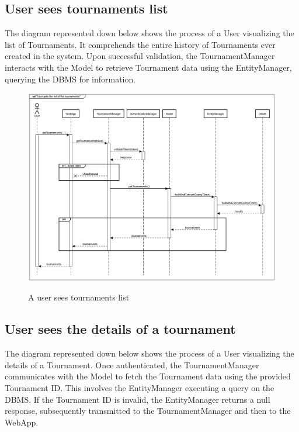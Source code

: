 \documentclass{Configuration_Files/Template}
\begin{document}
\subsection{User sees tournaments list}

The diagram represented down below shows the process of a User visualizing the list of Tournaments. It comprehends the entire history of Tournaments ever created in the system. Upon successful validation, the TournamentManager interacts with the Model to retrieve Tournament data using the EntityManager, querying the DBMS for information.

\begin{figure}[H]
\centering
\includegraphics[scale = 0.33]{Images/diagrams/sequences/getTournaments.png}\\
\caption{A user sees tournaments list }
\end{figure}

\subsection{User sees the details of a tournament}

The diagram represented down below shows the process of a User visualizing the details of a Tournament. Once authenticated, the TournamentManager communicates with the Model to fetch the Tournament data using the provided Tournament ID. This involves the EntityManager executing a query on the DBMS. If the Tournament ID is invalid, the EntityManager returns a null response, subsequently transmitted to the TournamentManager and then to the WebApp.
\end{document}
